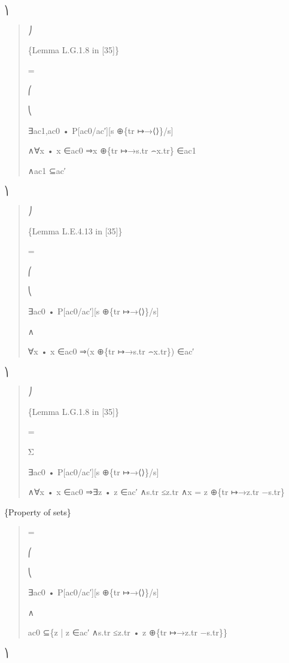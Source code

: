 \documentclass[11pt]{article}
\begin{document}
⎞

\begin{quote}\small\raggedright
⎠
\par
\{Lemma L.G.1.8 in [35]\}
\par
=
\par
⎛
\par
⎝
\par
∃ac1,ac0 • P[ac0/ac′][s ⊕\{tr ↦→⟨⟩\}/s]
\par
∧∀x • x ∈ac0 ⇒x ⊕\{tr ↦→s.tr ⌢x.tr\} ∈ac1
\par
∧ac1 ⊆ac′
\end{quote}

⎞

\begin{quote}\small\raggedright
⎠
\par
\{Lemma L.E.4.13 in [35]\}
\par
=
\par
⎛
\par
⎝
\par
∃ac0 • P[ac0/ac′][s ⊕\{tr ↦→⟨⟩\}/s]
\par
∧
\par
∀x • x ∈ac0 ⇒(x ⊕\{tr ↦→s.tr ⌢x.tr\}) ∈ac′
\end{quote}

⎞

\begin{quote}\small\raggedright
⎠
\par
\{Lemma L.G.1.8 in [35]\}
\par
=
\par
Σ
\par
∃ac0 • P[ac0/ac′][s ⊕\{tr ↦→⟨⟩\}/s]
\par
∧∀x • x ∈ac0 ⇒∃z • z ∈ac′ ∧s.tr ≤z.tr ∧x = z ⊕\{tr ↦→z.tr −s.tr\}
\end{quote}

\{Property of sets\}

\begin{quote}\small\raggedright
=
\par
⎛
\par
⎝
\par
∃ac0 • P[ac0/ac′][s ⊕\{tr ↦→⟨⟩\}/s]
\par
∧
\par
ac0 ⊆\{z | z ∈ac′ ∧s.tr ≤z.tr • z ⊕\{tr ↦→z.tr −s.tr\}\}
\end{quote}

⎞
\end{document}
